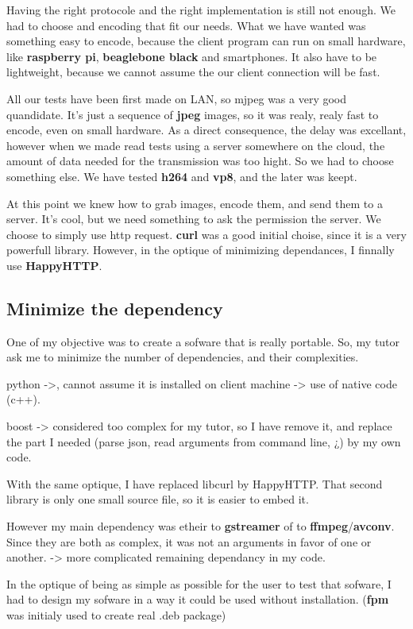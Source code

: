\documentclass[a4paper,11pt]{custom}
\newcommand{\avconv}{\textbf{avconv}}
\newcommand{\ffmpeg}{\textbf{ffmpeg}}
\newcommand{\gstreamer}{\textbf{gstreamer}}
\newcommand{\curl}{\textbf{curl}}
\newcommand{\happyhttp}{\textbf{HappyHTTP}}
\newcommand{\jpeg}{\textbf{jpeg}}
\newcommand{\vpx}{\textbf{vp8}}
\newcommand{\mpeg}{\textbf{h264}}
\newcommand{\fpm}{\textbf{fpm}}
\newcommand{\rpi}{\textbf{raspberry pi}}
\newcommand{\bbb}{\textbf{beaglebone black}}
\begin{document}
Having the right protocole and the right implementation is still not enough. We
had to choose and encoding that fit our needs. What we have wanted was something
easy to encode, because the client program can run on small hardware, like \rpi,
\bbb{} and smartphones. It also have to be lightweight, because we cannot assume
the our client connection will be fast.

All our tests have been first made on LAN, so mjpeg was a very good quandidate.
It's just a sequence of \jpeg{} images, so it was realy, realy fast to encode,
even on small hardware. As a direct consequence, the delay was excellant,
however when we made read tests using a server somewhere on the cloud, the
amount of data needed for the transmission was too hight. So we had to choose
something else. We have tested \mpeg{} and \vpx, and the later was keept.

At this point we knew how to grab images, encode them, and send them to a
server. It's cool, but we need something to ask the permission the server. We
choose to simply use http request. \curl{} was a good initial choise, since it is
a very powerfull library. However, in the optique of minimizing dependances, I
finnally use \happyhttp.

\subsection{Minimize the dependency}

One of my objective was to create a sofware that is really portable. So, my
tutor ask me to minimize the number of dependencies, and their complexities.

python ->, cannot assume it is installed on client machine -> use of native code
(c++).

boost -> considered too complex for my tutor, so I have remove it, and replace
the part I needed (parse json, read arguments from command line, ¿) by my own
code.

With the same optique, I have replaced libcurl by HappyHTTP. That second library
is only one small source file, so it is easier to embed it.

However my main dependency was etheir to \gstreamer{} of to \ffmpeg/\avconv. Since
they are both as complex, it was not an arguments in favor of one or another.
-> more complicated remaining dependancy in my code.

In the optique of being as simple as possible for the user to test that sofware,
I had to design my sofware in a way it could be used without installation.
(\fpm{} was initialy used to create real .deb package)
\end{document}
